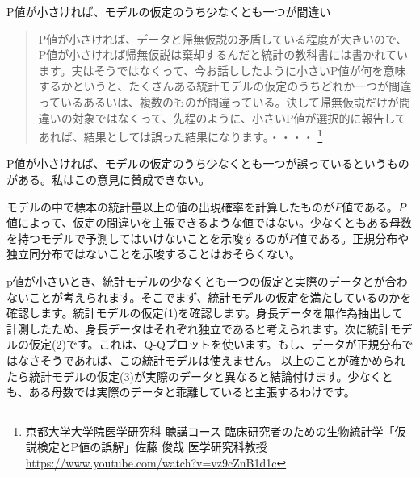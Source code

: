 \begin{SMbox}{P値が小さければ、モデルの仮定のうち少なくとも一つが間違い}
    \ 
    \begin{quote}
        P値が小さければ、データと帰無仮説の矛盾している程度が大きいので、P値が小さければ帰無仮説は棄却するんだと統計の教科書には書かれています。実はそうではなくって、今お話ししたように小さいP値が何を意味するかというと、たくさんある統計モデルの仮定のうちどれか一つが間違っているあるいは、複数のものが間違っている。決して帰無仮説だけが間違いの対象ではなくって、先程のように、小さいP値が選択的に報告してあれば、結果としては誤った結果になります。・・・・
        \footnote{京都大学大学院医学研究科 聴講コース 臨床研究者のための生物統計学「仮説検定とP値の誤解」佐藤 俊哉 医学研究科教授 \url{https://www.youtube.com/watch?v=vz9cZnB1d1c} }
    \end{quote}
    P値が小さければ、モデルの仮定のうち少なくとも一つが誤っているというものがある。私はこの意見に賛成できない。

    モデルの中で標本の統計量以上の値の出現確率を計算したものが$P$値である。$P$値によって、仮定の間違いを主張できるような値ではない。少なくともある母数を持つモデルで予測してはいけないことを示唆するのが$P$値である。正規分布や独立同分布ではないことを示唆することはおそらくない。

\end{SMbox}



p値が小さいとき、統計モデルの少なくとも一つの仮定と実際のデータとが合わないことが考えられます。そこでまず、統計モデルの仮定を満たしているのかを確認します。統計モデルの仮定(1)を確認します。身長データを無作為抽出して計測したため、身長データはそれぞれ独立であると考えられます。次に統計モデルの仮定(2)です。これは、Q-Qプロットを使います。もし、データが正規分布ではなさそうであれば、この統計モデルは使えません。
以上のことが確かめられたら統計モデルの仮定(3)が実際のデータと異なると結論付けます。少なくとも、ある母数では実際のデータと乖離していると主張するわけです。
\fi


